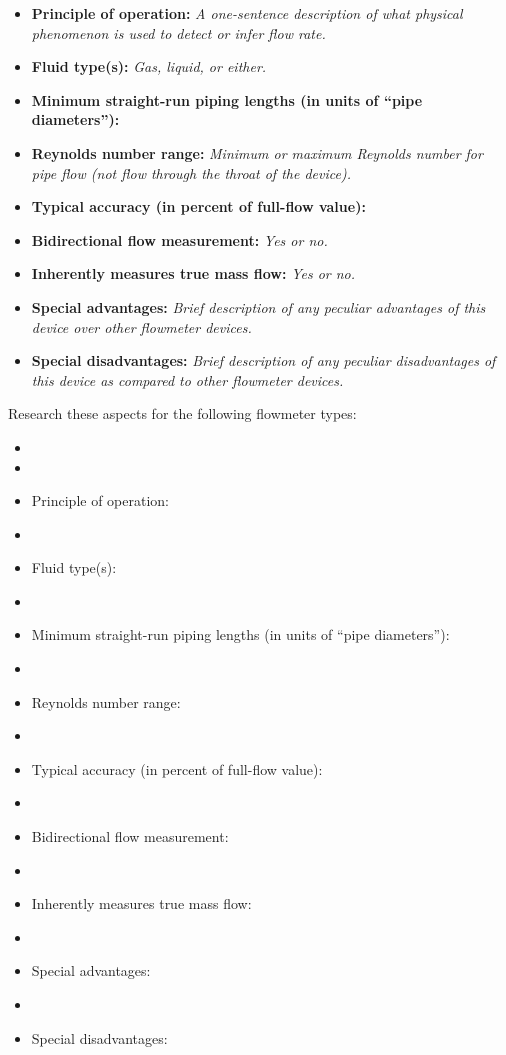 \documentclass[12pt,a4paper]{article}
\begin{document}
\begin{itemize}
\item{} {\bf Principle of operation:} {\it A one-sentence description of what physical phenomenon is used to detect or infer flow rate.}
\item{} {\bf Fluid type(s):} {\it Gas, liquid, or either.}
\item{} {\bf Minimum straight-run piping lengths (in units of ``pipe diameters''):}
\item{} {\bf Reynolds number range:} {\it Minimum or maximum Reynolds number for pipe flow (not flow through the throat of the device).}
\item{} {\bf Typical accuracy (in percent of full-flow value):}  
\item{} {\bf Bidirectional flow measurement:} {\it Yes or no.}
\item{} {\bf Inherently measures true mass flow:} {\it Yes or no.}
\item{} {\bf Special advantages:} {\it Brief description of any peculiar advantages of this device over other flowmeter devices.}
\item{} {\bf Special disadvantages:} {\it Brief description of any peculiar disadvantages of this device as compared to other flowmeter devices.}
\end{itemize}


\vskip 10pt

Research these aspects for the following flowmeter types:

\begin{itemize}
\goodbreak
\item{} 
\vskip 5pt
\item\item{} Principle of operation:
\vskip 5pt
\item\item{} Fluid type(s):
\vskip 5pt
\item\item{} Minimum straight-run piping lengths (in units of ``pipe diameters''):
\vskip 5pt
\item\item{} Reynolds number range:
\vskip 5pt
\item\item{} Typical accuracy (in percent of full-flow value):
\vskip 5pt
\item\item{} Bidirectional flow measurement:
\vskip 5pt
\item\item{} Inherently measures true mass flow:
\vskip 5pt
\item\item{} Special advantages:
\vskip 5pt
\item\item{} Special disadvantages:
\end{itemize}
\end{document}

